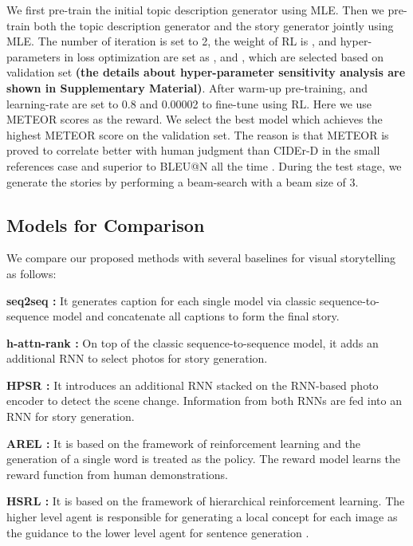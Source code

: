 \documentclass[11pt]{article}
\newcommand{\citep}{\cite}
\begin{document}
We first pre-train the initial topic description generator using MLE. Then we pre-train both the topic description generator and the story generator jointly using MLE. The number of iteration  is set to 2, the weight of RL is , and hyper-parameters in loss optimization are set as ,  and , which are selected based on validation set \textbf{(the details about hyper-parameter sensitivity analysis are shown in Supplementary Material)}. After warm-up pre-training,  and learning-rate are set to 0.8 and 0.00002 to fine-tune using RL. Here we use METEOR scores as the reward. We select the best model which achieves the highest METEOR score on the validation set. The reason is that METEOR is proved to correlate better with human judgment than CIDEr-D in the small references case and superior to BLEU@N all the time \citep{vedantam2015cider,wang2018show}. During the test stage, we generate the stories by performing a beam-search with a beam size of 3.




\subsection{Models for Comparison}
We compare our proposed methods with several baselines for visual storytelling  as follows:


\textbf{seq2seq \citep{huang2016visual}:} It generates caption for each single model via classic sequence-to-sequence model and concatenate all captions to form the final story.
	
\textbf{h-attn-rank \citep{yu2017hierarchically}:} On top of the classic sequence-to-sequence model, it adds an additional RNN to select photos for story generation. 

\textbf{HPSR \citep{wang2019hierarchical}:} It introduces an additional RNN stacked on the RNN-based photo encoder to detect the scene change. Information from both RNNs are fed into an RNN for story generation. 

\textbf{AREL \citep{Wang:2018tda}:} It is based on the framework of reinforcement learning and the generation of a single word is treated as the policy. The reward model learns the reward function from human demonstrations.


\textbf{HSRL \citep{huang2019hierarchically}:} It is based on the framework of hierarchical reinforcement learning. The higher level agent is responsible for generating a local concept for each image as the guidance to the lower level agent for sentence generation . 
\end{document}
